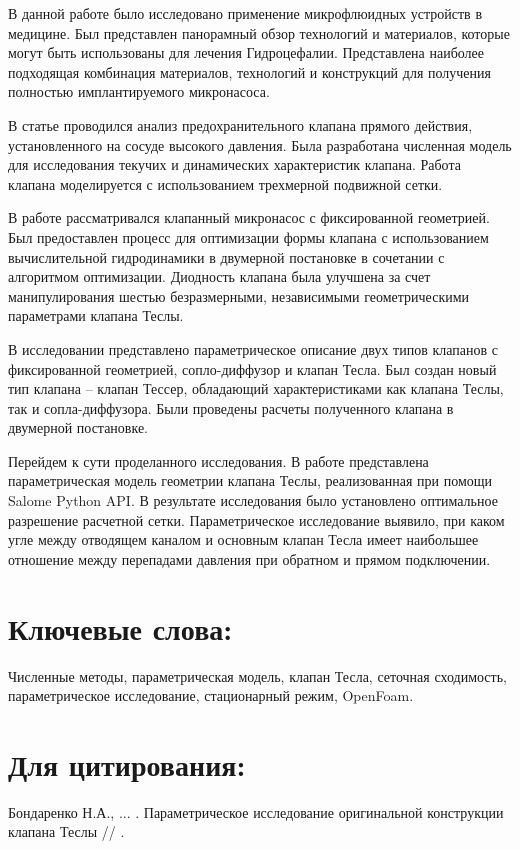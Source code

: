 \documentclass[14pt,a4paper]{article}
\begin{document}
        В данной работе \cite{article} было исследовано применение микрофлюидных устройств в медицине. Был представлен панорамный обзор технологий и материалов, которые могут быть использованы для лечения Гидроцефалии. Представлена наиболее подходящая комбинация материалов, технологий и конструкций для получения полностью имплантируемого микронасоса. 
        
        В статье \cite{SONG2014407} проводился анализ предохранительного клапана прямого действия, установленного на сосуде высокого давления. Была разработана численная модель для исследования текучих и динамических характеристик клапана. Работа клапана моделируется с использованием трехмерной подвижной сетки.
        
        В работе \cite{OptimizationOfTheFixed-GeometryValve} рассматривался клапанный микронасос с фиксированной геометрией. Был предоставлен процесс для оптимизации формы клапана с использованием вычислительной гидродинамики в двумерной постановке в сочетании с алгоритмом оптимизации. Диодность клапана была улучшена за счет манипулирования шестью безразмерными, независимыми геометрическими параметрами клапана Теслы.
        
        В исследовании \cite{inproceedings} представлено параметрическое описание двух типов клапанов с фиксированной геометрией, сопло-диффузор и клапан Тесла. Был создан новый тип клапана -- клапан Тессер, обладающий характеристиками как клапана Теслы, так и сопла-диффузора. Были проведены расчеты полученного клапана в двумерной постановке. 
        
        Перейдем к сути проделанного исследования. В работе представлена параметрическая модель геометрии клапана Теслы, реализованная при помощи Salome Python API. В результате исследования было установлено оптимальное разрешение расчетной сетки. Параметрическое исследование выявило, при каком угле между отводящем каналом и основным клапан Тесла имеет наибольшее отношение между перепадами давления при обратном и прямом подключении.   
                       
        \section*{Ключевые слова:}
        Численные методы, параметрическая модель, клапан Тесла, сеточная сходимость, параметрическое исследование, стационарный режим, OpenFoam.
        
        \section*{Для цитирования:}
        Бондаренко Н.А., ... . Параметрическое исследование оригинальной конструкции клапана Теслы // .
           
\end{document}
